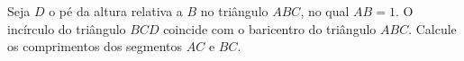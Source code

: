 Seja $D$ o pé da altura relativa a $B$ no triângulo $ABC$, no qual $AB = 1$. O incírculo do triângulo $BCD$ coincide com o baricentro do triângulo $ABC$. Calcule os comprimentos dos segmentos $AC$ e $BC$.
